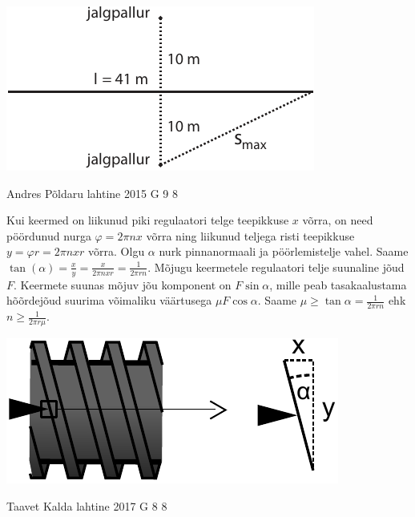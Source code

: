 \documentclass[11pt, twoside]{article}
\begin{document}
{{\begin{center}
\includegraphics{2013-v3g-09-jalgpallurid}
\end{center}
\fi
}

{Andres Põldaru} %
{lahtine} %
{2015} %
{G 9} %
{8} %
{

\ifSolution
Kui keermed on liikunud piki regulaatori telge teepikkuse $x$ võrra, on need pöördunud nurga $\varphi=2\pi nx$ võrra ning liikunud teljega risti teepikkuse $y=\varphi r=2\pi nxr$ võrra. Olgu $\alpha$ nurk pinnanormaali ja pöörlemistelje vahel. Saame $\tan(\alpha)=\frac{x}{y}=\frac{x}{2\pi nxr}=\frac{1}{2\pi rn}$. Mõjugu keermetele regulaatori telje suunaline jõud $F$. Keermete suunas mõjuv jõu komponent on $F\sin\alpha$, mille peab tasakaalustama hõõrdejõud suurima võimaliku väärtusega $\mu F\cos\alpha$. Saame $\mu\geq\tan\alpha=\frac{1}{2\pi rn}$ ehk $n\ge\frac{1}{2\pi r\mu}$.

\begin{center}
\includegraphics[width=0.5\linewidth]{2015-lahg-09-mutriv6ti_lahendus.pdf}
\end{center}
\fi
}

{Taavet Kalda} %
{lahtine} %
{2017} %
{G 8} %
{8} %
{

}}
\end{document}
